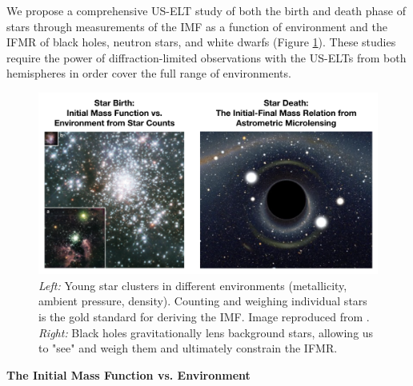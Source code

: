 \documentclass[11pt]{article}
\begin{document}
We propose a comprehensive US-ELT study of both the birth and death
phase of stars through measurements of the IMF as a function of
environment and the IFMR of black holes, neutron stars, and white
dwarfs (Figure \ref{fig:top_level}). 
These studies require the power of
diffraction-limited observations with the US-ELTs from both hemispheres in order
cover the full range of environments. 

\begin{figure}[h]
    \centering
    \includegraphics[scale=0.3]{ksp_useltp2018_fig1.png}
    \caption{{\em Left:} Young star clusters in different environments (metallicity, ambient pressure, density). Counting and weighing individual stars is the gold standard for deriving the IMF. Image reproduced from \citet{Zinnecker:2007}. {\em Right:} Black holes gravitationally lens background stars, allowing us to "see" and weigh them and ultimately constrain the IFMR.}
    \label{fig:top_level}
\end{figure}

{\bf \large The Initial Mass Function vs. Environment}
\end{document}
